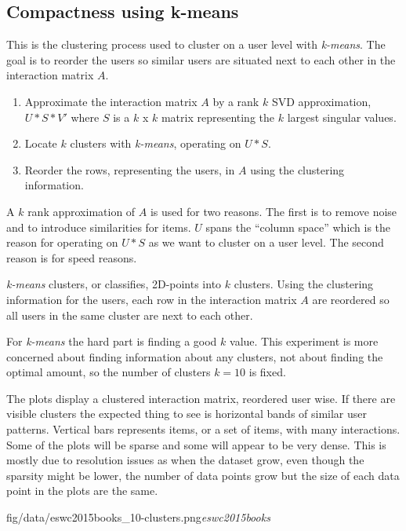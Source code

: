 
\subsection{Compactness using k-means}

This is the clustering process used to cluster on a user level with \textit{k-means}. The goal is to reorder the users so similar users are situated next to each other in the interaction matrix $A$.

\begin{enumerate}
    \item Approximate the interaction matrix $A$ by a rank $k$ SVD approximation, $U * S * V'$ where $S$ is a $k$ x $k$ matrix representing the $k$ largest singular values.
    \item Locate $k$ clusters with \textit{k-means}, operating on $U * S$.
    \item Reorder the rows, representing the users, in $A$ using the clustering information.
\end{enumerate}

A $k$ rank approximation of $A$ is used for two reasons. The first is to remove noise and to introduce similarities for items. $U$ spans the ``column space'' which is the reason for operating on $U * S$ as we want to cluster on a user level. The second reason is for speed reasons.

\textit{k-means} clusters, or classifies, 2D-points into $k$ clusters. Using the clustering information for the users, each row in the interaction matrix $A$ are reordered so all users in the same cluster are next to each other.

For \textit{k-means} the hard part is finding a good $k$ value. This experiment is more concerned about finding information about any clusters, not about finding the optimal amount, so the number of clusters $k = 10$ is fixed.

The plots display a clustered interaction matrix, reordered user wise.
If there are visible clusters the expected thing to see is horizontal bands of similar user patterns. Vertical bars represents items, or a set of items, with many interactions.  Some of the plots will be sparse and some will appear to be very dense. This is mostly due to resolution issues as when the dataset grow, even though the sparsity might be lower, the number of data points grow but the size of each data point in the plots are the same.

\FloatBarrier

{fig/data/eswc2015books_10-clusters.png}{\textit{eswc2015books}}

